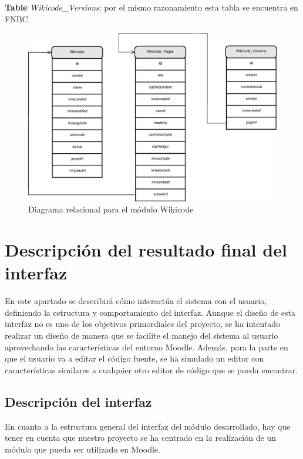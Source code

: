 \begin{description}
	\item{\textbf{Table} \emph{Wikicode\_Versions}}: por el mismo razonamiento esta tabla se encuentra en FNBC.
\end{description}

\begin{figure}[h]
	\centering
	\includegraphics[width=\textwidth]{./img/ERelacional.eps}
	\caption{Diagrama relacional para el módulo Wikicode}
\end{figure}

\section{Descripción del resultado final del interfaz}

En este apartado se describirá cómo interactúa el sistema con el usuario, definiendo la estructura y comportamiento del interfaz. Aunque el diseño de esta interfaz no es uno de los objetivos primordiales del proyecto, se ha intentado realizar un diseño de manera que se facilite el manejo del sistema al usuario aprovechando las características del entorno Moodle. Además, para la parte en que el usuario va a editar el código fuente, se ha simulado un editor con características similares a cualquier otro editor de código que se pueda encontrar.

\subsection{Descripción del interfaz}

En cuanto a la estructura general del interfaz del módulo desarrollado, hay que tener en cuenta que nuestro proyecto se ha centrado en la realización de un módulo que pueda ser utilizado en Moodle.

